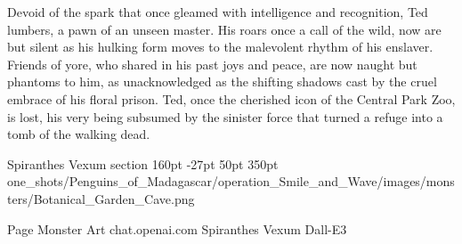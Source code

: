 Devoid of the spark that once gleamed with intelligence and recognition, Ted lumbers, a pawn of an unseen master. His roars once a call of the wild, now are but silent as his hulking form moves to the malevolent rhythm of his enslaver. Friends of yore, who shared in his past joys and peace, are now naught but phantoms to him, as unacknowledged as the shifting shadows cast by the cruel embrace of his floral prison. Ted, once the cherished icon of the Central Park Zoo, is lost, his very being subsumed by the sinister force that turned a refuge into a tomb of the walking dead.

\hfill

\def\primarycolor{titlered}%
\def\secondarycolor{white}%
\MonsterBannerGraphic%
	{Spiranthes Vexum} %
	{section} %
	{160pt} %
	{-27pt} %
	{50pt} %
	{350pt} %
	{\PATH one_shots/Penguins_of_Madagascar/operation_Smile_and_Wave/images/monsters/Botanical_Garden_Cave.png} %
	{} %
\label{sec:SpiranthesVexum}
%

%
	{Page \thepage}%
	{Monster Art}%
	{chat.openai.com}%
	{Spiranthes Vexum}%
	{Dall-E3}%

